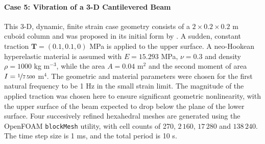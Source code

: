 \documentclass[sn-mathphys,Numbered]{sn-jnl}%
\newcommand{\bb}{\boldsymbol}
\begin{document}
\paragraph{Case 5: Vibration of a 3-D Cantilevered Beam}
This 3-D, dynamic, finite strain case geometry consists of a $2 \times 0.2 \times 0.2$ m cuboid column and was proposed in its initial form by \citet{Tukovic2007}.
A sudden, constant traction $\bb{T} = \left(0.1, 0.1, 0 \right)$ MPa is applied to the upper surface.
A neo-Hookean hyperelastic material is assumed with $E = 15.293$ MPa, $\nu = 0.3$ and density $\rho = 1000$ kg m$^{-3}$, while the area $A = 0.04$ m$^2$ and the second moment of area $I = \nicefrac{1}{7\,500}$ m$^4$. %
The geometric and material parameters were chosen for the first natural frequency to be 1 Hz in the small strain limit.
The magnitude of the applied traction was chosen here to ensure significant geometric nonlinearity, with the upper surface of the beam expected to drop below the plane of the lower surface.
Four succesively refined hexahedral meshes are generated using the OpenFOAM \texttt{blockMesh} utility, with cell counts of 270, $2\,160$, $17\,280$ and $138\,240$.
The time step size is 1 ms, and the total period is 10 s.
\end{document}
